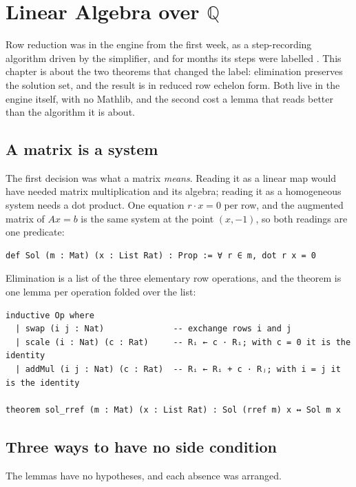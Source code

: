 \chapter{Linear Algebra over $\mathbb{Q}$}\label{ch:linalg}

Row reduction was in the engine from the first week, as a step-recording algorithm driven by the
simplifier, and for months its steps were labelled . This chapter is about the
two theorems that changed the label: elimination preserves the solution set, and the result is in
reduced row echelon form. Both live in the engine itself, with no Mathlib, and the second cost a
lemma that reads better than the algorithm it is about.

\section{A matrix is a system}

The first decision was what a matrix \emph{means}. Reading it as a linear map would have needed
matrix multiplication and its algebra; reading it as a homogeneous system needs a dot product.
One equation $r \cdot x = 0$ per row, and the augmented matrix of $Ax = b$ is the same system at
the point $(x, -1)$, so both readings are one predicate:

\begin{verbatim}
def Sol (m : Mat) (x : List Rat) : Prop := ∀ r ∈ m, dot r x = 0
\end{verbatim}

Elimination is a list of the three elementary row operations, and the theorem is one lemma per
operation folded over the list:

\begin{verbatim}
inductive Op where
  | swap (i j : Nat)              -- exchange rows i and j
  | scale (i : Nat) (c : Rat)     -- Rᵢ ← c · Rᵢ; with c = 0 it is the identity
  | addMul (i j : Nat) (c : Rat)  -- Rᵢ ← Rᵢ + c · Rⱼ; with i = j it is the identity

theorem sol_rref (m : Mat) (x : List Rat) : Sol (rref m) x ↔ Sol m x
\end{verbatim}

\section{Three ways to have no side condition}

The lemmas have no hypotheses, and each absence was arranged.

